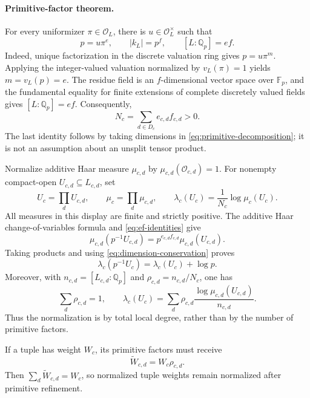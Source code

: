 \paragraph{Primitive-factor theorem.}
For every uniformizer $\pi\in\mathcal O_L$, there is
$u\in\mathcal O_L^\times$ such that
\begin{equation}
 p=u\pi^e,\qquad |k_L|=p^f,
 \qquad [L:\mathbb Q_p]=ef.
 \label{eq:ef-identities}
\end{equation}
Indeed, unique factorization in the discrete valuation ring gives
$p=u\pi^m$.  Applying the integer-valued valuation normalized by
$v_L(\pi)=1$ yields $m=v_L(p)=e$.  The residue field is an
$f$-dimensional vector space over $\mathbb F_p$, and the fundamental equality
for finite extensions of complete discretely valued fields gives
$[L:\mathbb Q_p]=ef$.  Consequently,
\begin{equation}
 N_c=\sum_{d\in D_c}e_{c,d}f_{c,d}>0.
 \label{eq:dimension-conservation}
\end{equation}
The last identity follows by taking dimensions in
\eqref{eq:primitive-decomposition}; it is not an assumption about an
unsplit tensor product.

Normalize additive Haar measure $\mu_{c,d}$ by
$\mu_{c,d}(\mathcal O_{c,d})=1$.  For nonempty compact-open
$U_{c,d}\subseteq L_{c,d}$, set
\[
 U_c=\prod_dU_{c,d},\qquad
 \mu_c=\prod_d\mu_{c,d},\qquad
 \lambda_c(U_c)=\frac{1}{N_c}\log\mu_c(U_c).
\]
All measures in this display are finite and strictly positive.  The additive
Haar change-of-variables formula and \eqref{eq:ef-identities} give
\[
 \mu_{c,d}(p^{-1}U_{c,d})
   =p^{e_{c,d}f_{c,d}}\mu_{c,d}(U_{c,d}).
\]
Taking products and using \eqref{eq:dimension-conservation} proves
\begin{equation}
 \lambda_c(p^{-1}U_c)=\lambda_c(U_c)+\log p.
 \label{eq:normalized-prime-shift}
\end{equation}
Moreover, with $n_{c,d}=[L_{c,d}:\mathbb Q_p]$ and
$\rho_{c,d}=n_{c,d}/N_c$, one has
\begin{equation}
 \sum_d\rho_{c,d}=1,
 \qquad
 \lambda_c(U_c)=
 \sum_d\rho_{c,d}
   \frac{\log\mu_{c,d}(U_{c,d})}{n_{c,d}}.
 \label{eq:relative-degree-average}
\end{equation}
Thus the normalization is by total local degree, rather than by the number
of primitive factors.

If a tuple has weight $W_c$, its primitive factors must receive
\begin{equation}
 \widetilde W_{c,d}=W_c\rho_{c,d}.
 \label{eq:refined-weights}
\end{equation}
Then $\sum_d\widetilde W_{c,d}=W_c$, so normalized tuple weights remain
normalized after primitive refinement.

